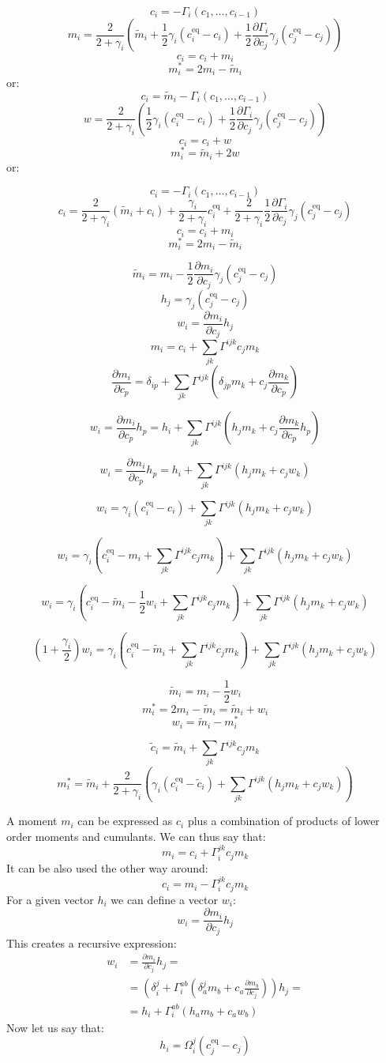 \documentclass{article}
\newcommand{\rr}[2]{\frac{\partial #1}{\partial #2}}
\newcommand{\eq}{\text{eq}}
\newcommand{\m}{\tilde{m}}
\renewcommand{\c}{\tilde{c}}
\begin{document}
\newpage

\[c_i = - \Gamma_i(c_1,\ldots,c_{i-1}) \]
\[m_i = \frac{2}{2+\gamma_i}\left(\m_i + \frac{1}{2}\gamma_i(c^\eq_i - c_i) + \frac{1}{2}\rr{\Gamma_i}{c_j}\gamma_j(c^\eq_j-c_j)\right)\]
\[c_i = c_i + m_i\]
\[m_i^\ast = 2m_i - \m_i\]
or:
\[c_i = \m_i - \Gamma_i(c_1,\ldots,c_{i-1}) \]
\[w = \frac{2}{2+\gamma_i}\left(\frac{1}{2}\gamma_i(c^\eq_i - c_i) + \frac{1}{2}\rr{\Gamma_i}{c_j}\gamma_j(c^\eq_j-c_j)\right)\]
\[c_i = c_i + w\]
\[m_i^\ast = \m_i + 2w\]
or:


\[c_i = - \Gamma_i(c_1,\ldots,c_{i-1}) \]
\[c_i = \frac{2}{2+\gamma_i}(\m_i + c_i) + \frac{\gamma_i}{2+\gamma_i}c^\eq_i + \frac{2}{2+\gamma_i}\frac{1}{2}\rr{\Gamma_i}{c_j}\gamma_j(c^\eq_j-c_j)\]
\[c_i = c_i + m_i\]
\[m_i^\ast = 2m_i - \m_i\]

\newpage

\[\m_i = m_i - \frac{1}{2}\rr{m_i}{c_j}\gamma_j(c^\eq_j-c_j)\]
\[h_j = \gamma_j(c^\eq_j-c_j)\]
\[w_i = \rr{m_i}{c_j}h_j\]
\[m_i = c_i + \sum_{jk}\Gamma^{ijk}c_jm_k\]
\[\rr{m_i}{c_p} = \delta_{ip} + \sum_{jk}\Gamma^{ijk}\left(\delta_{jp}m_k + c_j\rr{m_k}{c_p}\right)\]

\[w_i = \rr{m_i}{c_p}h_p = h_i + \sum_{jk}\Gamma^{ijk}\left(h_j m_k + c_j\rr{m_k}{c_p}h_p\right)\]

\[w_i = \rr{m_i}{c_p}h_p = h_i + \sum_{jk}\Gamma^{ijk}\left(h_j m_k + c_jw_k\right)\]

\[w_i = \gamma_i(c^\eq_i-c_i) + \sum_{jk}\Gamma^{ijk}\left(h_j m_k + c_jw_k\right)\]

\[w_i = \gamma_i(c^\eq_i-m_i + \sum_{jk}\Gamma^{ijk}c_jm_k) + \sum_{jk}\Gamma^{ijk}\left(h_j m_k + c_jw_k\right)\]

\[w_i = \gamma_i(c^\eq_i-\m_i-\frac{1}{2}w_i + \sum_{jk}\Gamma^{ijk}c_jm_k) + \sum_{jk}\Gamma^{ijk}\left(h_j m_k + c_jw_k\right)\]

\[(1+\frac{\gamma_i}{2})w_i = \gamma_i(c^\eq_i-\m_i + \sum_{jk}\Gamma^{ijk}c_jm_k) + \sum_{jk}\Gamma^{ijk}\left(h_j m_k + c_jw_k\right)\]


\[\m_i = m_i - \frac{1}{2}w_i\]
\[m_i^\ast = 2m_i - \m_i = \m_i+w_i\]
\[w_i = \m_i - m_i^\ast\]

\[\c_i = \m_i + \sum_{jk}\Gamma^{ijk}c_jm_k\]
\[m_i^\ast = \m_i+\frac{2}{2+\gamma_i}\left(\gamma_i(c^\eq_i-\c_i) + \sum_{jk}\Gamma^{ijk}\left(h_j m_k + c_jw_k\right)\right)\]

\newpage

A moment $m_i$ can be expressed as $c_i$ plus a combination of products of lower order moments and cumulants. We can thus say that:
\[m_i = c_i + \Gamma^{jk}_i c_j m_k\]
It can be also used the other way around:
\[c_i = m_i - \Gamma^{jk}_i c_j m_k\]
For a given vector $h_i$ we can define a vector $w_i$:
\[w_i = \rr{m_i}{c_j}h_j\]
This creates a recursive expression:
\begin{align*}w_i
&= \rr{m_i}{c_j}h_j =\\
&= \left(\delta_i^j + \Gamma^{ab}_i\left(\delta_a^j m_b + c_a\rr{m_b}{c_j}\right)\right)h_j=\\
&= h_i + \Gamma^{ab}_i \left(h_a m_b + c_a w_b\right)
\end{align*}
Now let us say that:
\[h_i = \Omega_i^j(c^\eq_j-c_j)\]
\end{document}
